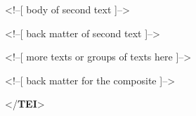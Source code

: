 \documentclass[11pt,twoside]{article}\makeatletter
\begin{document}
\begin{shaded}
\hspace*{6pt}\hspace*{6pt}\hspace*{6pt}\mbox{}\newline 
\begin{it}<!--[ body of second text  ]-->\end{it}\mbox{}\newline 
\hspace*{6pt}\hspace*{6pt}\hspace*{6pt}\mbox{}\newline 
\hspace*{6pt}\hspace*{6pt}\hspace*{6pt}\mbox{}\newline 
\begin{it}<!--[ back matter of second text ]-->\end{it}\mbox{}\newline 
\hspace*{6pt}\hspace*{6pt}\hspace*{6pt}\mbox{}\newline 
\hspace*{6pt}\hspace*{6pt}\mbox{}\newline 
\begin{it}<!--[ more texts or groups of texts here ]-->\end{it}\mbox{}\newline 
\hspace*{6pt}\mbox{}\newline 
\hspace*{6pt}\mbox{}\newline 
\begin{it}<!--[ back matter for the composite  ]-->\end{it}\mbox{}\newline 
\hspace*{6pt}\mbox{}\newline 
{}\mbox{}\newline 
{</\textbf{TEI}>}\end{shaded}\egroup\par \par
\end{document}

